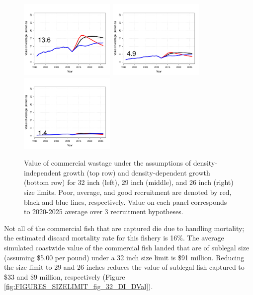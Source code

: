 \begin{figure}[htbp]
		\includegraphics[height=1.5in]{../FIGURES/SIZELIMIT/fig_32_DD_WVal.pdf}
		\includegraphics[height=1.5in]{../FIGURES/SIZELIMIT/fig_29_DD_WVal.pdf}
		\includegraphics[height=1.5in]{../FIGURES/SIZELIMIT/fig_26_DD_WVal.pdf}
	\caption{Value of commercial wastage under the assumptions of density-independent growth (top row) and density-dependent growth (bottom row) for 32 inch (left), 29 inch (middle), and 26 inch (right) size limits.  Poor, average, and good recruitment are denoted by red, black and blue lines, respectively.  Value on each panel corresponds to 2020-2025 average over 3 recruitment hypotheses.}
	\label{fig:FIGURES_SIZELIMIT_fig_32_DI_WVal}
\end{figure}

Not all of the commercial fish that are captured die due to handling mortality; the estimated discard mortality rate for this fishery is 16\%.  The average simulated coastwide value of the commercial fish landed that are of sublegal size (assuming \$5.00 per pound) under a 32 inch size limit is \$91 million.  Reducing the size limit to 29 and 26 inches reduces the value of sublegal fish captured to \$33 and \$9 million, respectively (Figure \ref{fig:FIGURES_SIZELIMIT_fig_32_DI_DVal}).  



